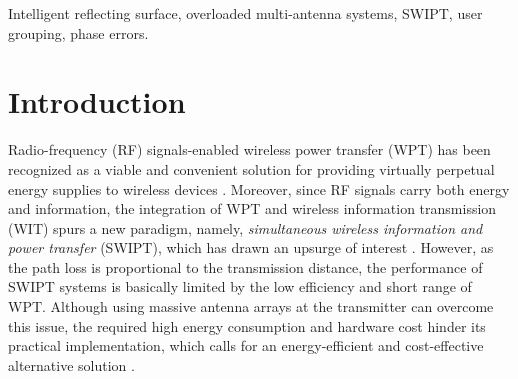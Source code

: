 \documentclass[12pt,draftclsnofoot, onecolumn]{IEEEtran}
\theoremstyle{plain}
\begin{document}
\begin{sloppypar}

\begin{IEEEkeywords}
	\vspace{-3mm}
    Intelligent reflecting surface, overloaded multi-antenna systems, SWIPT, user grouping, phase errors.
\end{IEEEkeywords}

\section{Introduction}
\vspace{-1mm}
Radio-frequency (RF) signals-enabled wireless power transfer (WPT) has been recognized as a viable and convenient solution for providing virtually perpetual energy supplies to wireless devices \cite{2015_Suzhi_WPT_intro}. Moreover, since RF signals carry both energy and information, the integration of WPT and wireless information transmission (WIT) spurs a new paradigm, namely, \emph{simultaneous wireless information and power transfer} (SWIPT), which has drawn an upsurge of interest \cite{2008_Varshney_SWIPT,2013_Rui_MIMO_SWIPT}. However, as the path loss is proportional to the
transmission distance, the performance of SWIPT systems is basically limited by the low efficiency and short range of WPT. Although using massive antenna arrays at the transmitter can overcome this issue, the required high energy consumption and hardware cost hinder its practical implementation, which calls for an energy-efficient and cost-effective alternative solution \cite{2017_Qingqing_overview_5G}. 


\end{sloppypar}
\end{document}
